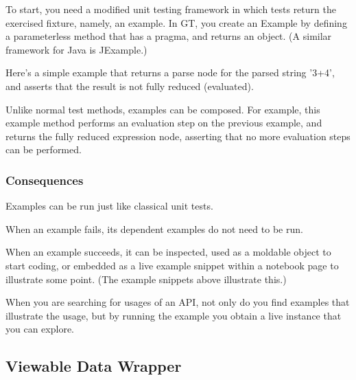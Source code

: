 \documentclass[sigconf]{acmart}
\begin{document}
To start, you need a modified unit testing framework in which tests return the exercised fixture, namely, an example. In GT, you create an Example by defining a parameterless method that has a  pragma, and returns an object. (A similar framework for Java is JExample.)

Here's a simple example that returns a parse node for the parsed string '3+4', and asserts that the result is not fully reduced (evaluated).

    
Unlike normal test methods, examples can be composed. For example, this example method performs an evaluation step on the previous example, and returns the fully reduced expression node, asserting that no more evaluation steps can be performed.

    


\subsubsection*{Consequences}

Examples can be run just like classical unit tests.

When an example fails, its dependent examples do not need to be run.

When an example succeeds, it can be inspected, used as a moldable object to start coding, or embedded as a live example snippet within a notebook page to illustrate some point. (The example snippets above illustrate this.)

When you are searching for usages of an API, not only do you find examples that illustrate the usage, but by running the example you obtain a live instance that you can explore.



\subsection*{Viewable Data Wrapper}\label{pat:viewableDataWrapper}
\end{document}
